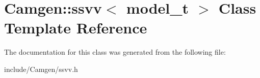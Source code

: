 \hypertarget{a00518}{}\section{Camgen\+:\+:ssvv$<$ model\+\_\+t $>$ Class Template Reference}
\label{a00518}


The documentation for this class was generated from the following file\+:\begin{DoxyCompactItemize}
\item 
include/\+Camgen/ssvv.\+h\end{DoxyCompactItemize}
